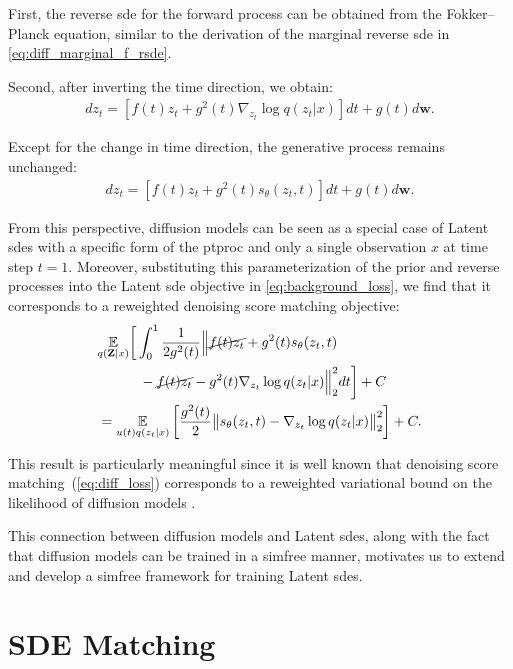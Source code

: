\documentclass{article}
\def\E{\mathbb{E}}
\def\Z{\mathbf{Z}}
\def\w{\mathbf{w}}
\def\th{\theta}
\def\n{\nabla}
\theoremstyle{plain}
\theoremstyle{definition}
\theoremstyle{remark}
\begin{document}
First, the reverse \gls{sde} for the forward process can be obtained from the Fokker–Planck equation, similar to the derivation of the marginal reverse \gls{sde} in \cref{eq:diff_marginal_f_rsde}. 


Second, after inverting the time direction, we obtain:
\begin{align}
    d z_t = [ f(t) z_t + g^2(t) \n_{z_t} \log q(z_t|x) ] d t + g(t) d \w.
    \label{eq:diff_f_rsde}
\end{align}


Except for the change in time direction, the generative process remains unchanged:
\begin{align}
    d z_t = [ f(t) z_t + g^2(t) s_\th(z_t, t) ] d t + g(t) d \w.
    \label{eq:diff_r_sde}
\end{align}


From this perspective, diffusion models can be seen as a special case of Latent \glspl{sde} with a specific form of the \gls{ptproc} and only a single observation $x$ at time step $t=1$. Moreover, substituting this parameterization of the prior and reverse processes into the Latent \gls{sde} objective in \cref{eq:background_loss}, we find that it corresponds to a reweighted denoising score matching objective:
\begin{align}
    & \underset{q(\Z|x)}{\E} \bigg[ \int_0^1 \frac{1}{ 2 g^2(t) } \Big\| 
        \cancel{ f(t) z_t } + g^2(t) s_\th(z_t, t) \nonumber \\
        & \quad \quad \quad - \cancel{ f(t) z_t } - g^2(t) \n_{z_t} \log q(z_t|x) 
    \Big\|_2^2 dt \bigg] + C \\
    & = \underset{u(t) q(z_t|x)}{\E} \left[ \frac{g^2(t)}{2} \big\| s_\th(z_t, t) - \n_{z_t} \log q(z_t|x) \big\|_2^2 \right] + C.
\end{align}


This result is particularly meaningful since it is well known that denoising score matching~(\cref{eq:diff_loss}) corresponds to a reweighted variational bound on the likelihood of diffusion models \cite{song2021maximum}.


This connection between diffusion models and Latent \glspl{sde}, along with the fact that diffusion models can be trained in a \gls{simfree} manner, motivates us to extend and develop a \gls{simfree} framework for training Latent \glspl{sde}.


\section{SDE Matching}
\label{sec:method}
\end{document}
